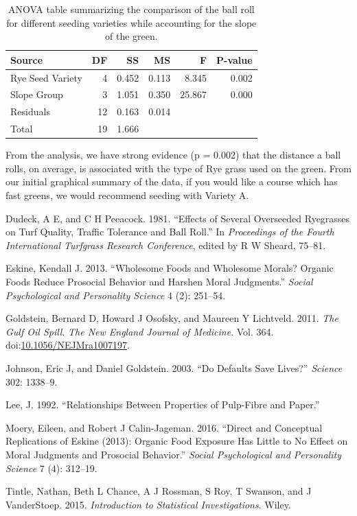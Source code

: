 \documentclass[]{book}
\theoremstyle{definition}
\theoremstyle{definition}
\theoremstyle{remark}
\begin{document}
\begin{table}

\caption{\label{tab:anovablocking-anova-table}ANOVA table summarizing the comparison of the ball roll for different seeding varieties while accounting for the slope of the green.}
\centering
\begin{tabular}[t]{l|r|r|r|r|r}
\hline
Source & DF & SS & MS & F & P-value\\
\hline
Rye Seed Variety & 4 & 0.452 & 0.113 & 8.345 & 0.002\\
\hline
Slope Group & 3 & 1.051 & 0.350 & 25.867 & 0.000\\
\hline
Residuals & 12 & 0.163 & 0.014 &  & \\
\hline
Total & 19 & 1.666 &  &  & \\
\hline
\end{tabular}
\end{table}

From the analysis, we have strong evidence (p = 0.002) that the distance
a ball rolls, on average, is associated with the type of Rye grass used
on the green. From our initial graphical summary of the data, if you
would like a course which has fast greens, we would recommend seeding
with Variety A.

\hypertarget{refs}{}
\hypertarget{ref-Dudeck1981}{}
Dudeck, A E, and C H Peeacock. 1981. ``Effects of Several Overseeded
Ryegrasses on Turf Quality, Traffic Tolerance and Ball Roll.'' In
\emph{Proceedings of the Fourth International Turfgrass Research
Conference}, edited by R W Sheard, 75--81.

\hypertarget{ref-Eskine2013}{}
Eskine, Kendall J. 2013. ``Wholesome Foods and Wholesome Morals? Organic
Foods Reduce Prosocial Behavior and Harshen Moral Judgments.''
\emph{Social Psychological and Personality Science} 4 (2): 251--54.

\hypertarget{ref-Goldstein2011}{}
Goldstein, Bernard D, Howard J Osofsky, and Maureen Y Lichtveld. 2011.
\emph{The Gulf Oil Spill}. \emph{The New England Journal of Medicine}.
Vol. 364.
doi:\href{https://doi.org/10.1056/NEJMra1007197}{10.1056/NEJMra1007197}.

\hypertarget{ref-Johnson2003}{}
Johnson, Eric J, and Daniel Goldstein. 2003. ``Do Defaults Save Lives?''
\emph{Science} 302: 1338--9.

\hypertarget{ref-Lee1992}{}
Lee, J. 1992. ``Relationships Between Properties of Pulp-Fibre and
Paper.''

\hypertarget{ref-Moery2016}{}
Moery, Eileen, and Robert J Calin-Jageman. 2016. ``Direct and Conceptual
Replications of Eskine (2013): Organic Food Exposure Has Little to No
Effect on Moral Judgments and Prosocial Behavior.'' \emph{Social
Psychological and Personality Science} 7 (4): 312--19.

\hypertarget{ref-Tintle2015}{}
Tintle, Nathan, Beth L Chance, A J Rossman, S Roy, T Swanson, and J
VanderStoep. 2015. \emph{Introduction to Statistical Investigations}.
Wiley.
\end{document}
